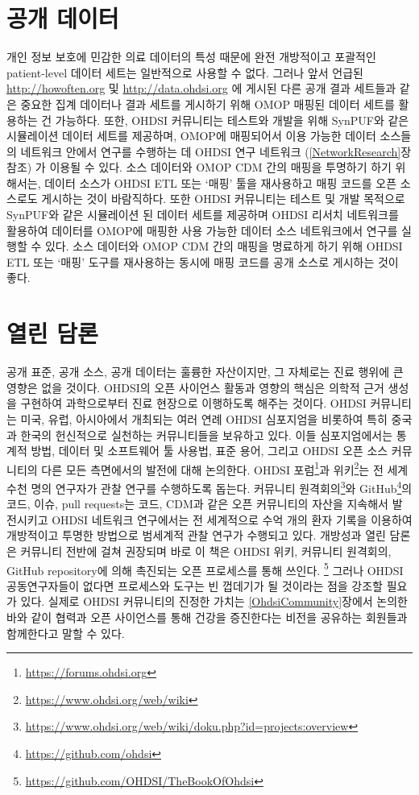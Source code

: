 \documentclass[11pt]{book}
\let\rmarkdownfootnote\footnote%
\def\footnote{\protect\rmarkdownfootnote}
\theoremstyle{definition}
\theoremstyle{definition}
\theoremstyle{definition}
\theoremstyle{remark}
\begin{document}
\section{공개 데이터}\label{-}


개인 정보 보호에 민감한 의료 데이터의 특성 때문에 완전 개방적이고
포괄적인 patient-level 데이터 세트는 일반적으로 사용할 수 없다. 그러나
앞서 언급된 \url{http://howoften.org} 및 \url{http://data.ohdsi.org} 에
게시된 다른 공개 결과 세트들과 같은 중요한 집계 데이터나 결과 세트를
게시하기 위해 OMOP 매핑된 데이터 세트를 활용하는 건 가능하다. 또한,
OHDSI 커뮤니티는 테스트와 개발을 위해 SynPUF와 같은 시뮬레이션 데이터
세트를 제공하며, OMOP에 매핑되어서 이용 가능한 데이터 소스들의 네트워크
안에서 연구를 수행하는 데 OHDSI 연구 네트워크 (\ref{NetworkResearch}장
참조) 가 이용될 수 있다. 소스 데이터와 OMOP CDM 간의 매핑을 투명하기
하기 위해서는, 데이터 소스가 OHDSI ETL 또는 `매핑' 툴을 재사용하고 매핑
코드를 오픈 소스로도 게시하는 것이 바람직하다. 또한 OHDSI 커뮤니티는
테스트 및 개발 목적으로 SynPUF와 같은 시뮬레이션 된 데이터 세트를
제공하며 OHDSI 리서치 네트워크를 활용하여 데이터를 OMOP에 매핑한 사용
가능한 데이터 소스 네트워크에서 연구를 실행할 수 있다. 소스 데이터와
OMOP CDM 간의 매핑을 명료하게 하기 위해 OHDSI ETL 또는 `매핑' 도구를
재사용하는 동시에 매핑 코드를 공개 소스로 게시하는 것이 좋다.

\section{열린 담론}\label{-}


공개 표준, 공개 소스, 공개 데이터는 훌륭한 자산이지만, 그 자체로는 진료
행위에 큰 영향은 없을 것이다. OHDSI의 오픈 사이언스 활동과 영향의 핵심은
의학적 근거 생성을 구현하여 과학으로부터 진료 현장으로 이행하도록 해주는
것이다. OHDSI 커뮤니티는 미국, 유럽, 아시아에서 개최되는 여러 연례 OHDSI
심포지엄을 비롯하여 특히 중국과 한국의 헌신적으로 실천하는 커뮤니티들을
보유하고 있다. 이들 심포지엄에서는 통계적 방법, 데이터 및 소프트웨어 툴
사용법, 표준 용어, 그리고 OHDSI 오픈 소스 커뮤니티의 다른 모든
측면에서의 발전에 대해 논의한다. OHDSI 포럼\footnote{\url{https://forums.ohdsi.org}}과
위키\footnote{\url{https://www.ohdsi.org/web/wiki}}는 전 세계 수천 명의
연구자가 관찰 연구를 수행하도록 돕는다. 커뮤니티 원격회의\footnote{\url{https://www.ohdsi.org/web/wiki/doku.php?id=projects:overview}}와
GitHub\footnote{\url{https://github.com/ohdsi}}의 코드, 이슈, pull
requests는 코드, CDM과 같은 오픈 커뮤니티의 자산을 지속해서 발전시키고
OHDSI 네트워크 연구에서는 전 세계적으로 수억 개의 환자 기록을 이용하여
개방적이고 투명한 방법으로 범세계적 관찰 연구가 수행되고 있다. 개방성과
열린 담론은 커뮤니티 전반에 걸쳐 권장되며 바로 이 책은 OHDSI 위키,
커뮤니티 원격회의, GitHub repository에 의해 촉진되는 오픈 프로세스를
통해 쓰인다. \footnote{\url{https://github.com/OHDSI/TheBookOfOhdsi}}
그러나 OHDSI 공동연구자들이 없다면 프로세스와 도구는 빈 껍데기가 될
것이라는 점을 강조할 필요가 있다. 실제로 OHDSI 커뮤니티의 진정한 가치는
\ref{OhdsiCommunity}장에서 논의한 바와 같이 협력과 오픈 사이언스를 통해
건강을 증진한다는 비전을 공유하는 회원들과 함께한다고 말할 수 있다.
\end{document}
